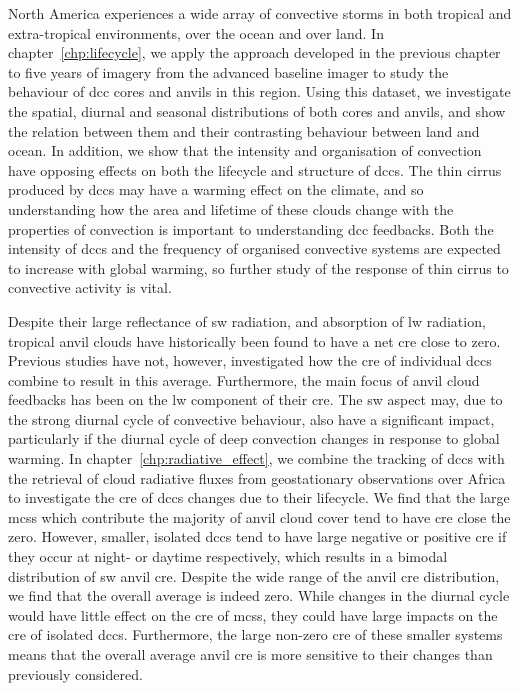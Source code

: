 North America experiences a wide array of convective storms in both tropical and extra-tropical environments, over the ocean and over land. In chapter~\ref{chp:lifecycle}, we apply the approach developed in the previous chapter to five years of imagery from the advanced baseline imager to study the behaviour of \acrshort{dcc} cores and anvils in this region. Using this dataset, we investigate the spatial, diurnal and seasonal distributions of both cores and anvils, and show the relation between them and their contrasting behaviour between land and ocean. In addition, we show that the intensity and organisation of convection have opposing effects on both the lifecycle and structure of \acrshort{dcc}s. The thin cirrus produced by \acrshort{dcc}s may have a warming effect on the climate, and so understanding how the area and lifetime of these clouds change with the properties of convection is important to understanding \acrshort{dcc} feedbacks. Both the intensity of \acrshort{dcc}s and the frequency of organised convective systems are expected to increase with global warming, so further study of the response of thin cirrus to convective activity is vital.

Despite their large reflectance of \acrfull{sw} radiation, and absorption of \acrfull{lw} radiation, tropical anvil clouds have historically been found to have a net \acrfull{cre} close to zero. Previous studies have not, however, investigated how the \acrshort{cre} of individual \acrshort{dcc}s combine to result in this average. Furthermore, the main focus of anvil cloud feedbacks has been on the \acrshort{lw} component of their \acrshort{cre}. The \acrshort{sw} aspect may, due to the strong diurnal cycle of convective behaviour, also have a significant impact, particularly if the diurnal cycle of deep convection changes in response to global warming. In chapter~\ref{chp:radiative_effect}, we combine the tracking of \acrshort{dcc}s with the retrieval of cloud radiative fluxes from geostationary observations over Africa to investigate the \acrshort{cre} of \acrshort{dcc}s changes due to their lifecycle. We find that the large \acrshort{mcs}s which contribute the majority of anvil cloud cover tend to have \acrshort{cre} close the zero. However, smaller, isolated \acrshort{dcc}s tend to have large negative or positive \acrshort{cre} if they occur at night- or daytime respectively, which results in a bimodal distribution of \acrshort{sw} anvil \acrshort{cre}. Despite the wide range of the anvil \acrshort{cre} distribution, we find that the overall average is indeed zero. While changes in the diurnal cycle would have little effect on the \acrshort{cre} of \acrshort{mcs}s, they could have large impacts on the \acrshort{cre} of isolated \acrshort{dcc}s. Furthermore, the large non-zero \acrshort{cre} of these smaller systems means that the overall average anvil \acrshort{cre} is more sensitive to their changes than previously considered.

